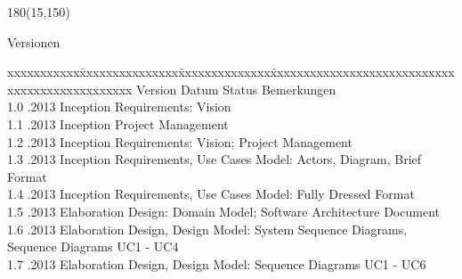 
\begin{textblock}{180}(15,150)
\color{black}
\begin{huge}
Versionen
\end{huge}
\vspace{10mm}

\fontsize{10pt}{18pt}\selectfont
\begin{tabbing}
xxxxxxxxxxx\=xxxxxxxxxxxxxxx\=xxxxxxxxxxxxxx\=xxxxxxxxxxxxxxxxxxxxxxxxxxxxxxxxxxxxxxxxxxxxxxx \kill
Version	\> Datum	\> Status		\> Bemerkungen \\
1.0	.2013	\> Inception		\> Requirements: Vision \\
1.1	.2013	\> Inception		\> Project Management \\
1.2	.2013	\> Inception		\> Requirements: Vision; Project Management \\
1.3	.2013	\> Inception		\> Requirements, Use Cases Model: Actors, Diagram, Brief Format \\
1.4	.2013	\> Inception		\> Requirements, Use Cases Model: Fully Dressed Format \\
1.5	.2013	\> Elaboration		\> Design: Domain Model; Software Architecture Document \\
1.6	.2013	\> Elaboration		\> Design, Design Model: System Sequence Diagrams, Sequence Diagrams UC1 - UC4 \\
1.7	.2013	\> Elaboration		\> Design, Design Model: Sequence Diagrams UC1 - UC6 \\
\end{tabbing}

\end{textblock}
